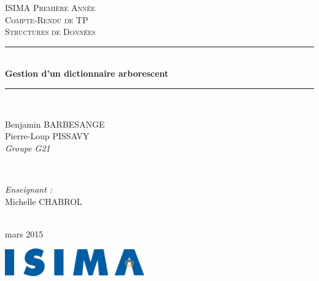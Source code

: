 \begin{titlepage}
  \newcommand{\HRule}{\rule{\linewidth}{0.5mm}}
  \center
  \null{}
  \vspace{3cm}

  \textsc{\LARGE ISIMA Première Année}\\[1.5cm]
  \textsc{\Large Compte-Rendu de TP}\\[0.5cm]
  \textsc{\LARGE Structures de Données}\\[1.5cm]
  \HRule \\[0.4cm]
  { \huge \bfseries Gestion d'un dictionnaire arborescent}\\
  \HRule \\[1.5cm]

  \begin{minipage}{0.4\textwidth}
    \begin{flushleft} \large
      Benjamin BARBESANGE\\
      Pierre-Loup PISSAVY\\
      {\normalsize\textit{Groupe G21}}
    \end{flushleft}
  \end{minipage}
  ~
  \begin{minipage}{0.4\textwidth}
    \begin{flushright} \large
      \emph{Enseignant :} \\
      Michelle CHABROL
    \end{flushright}
  \end{minipage}\\[4cm]

  {\large mars 2015}\\[3cm]

  \vfill

  \includegraphics[width=6cm]{settings/ISIMA_logo.pdf}\\[1cm]
\end{titlepage}

